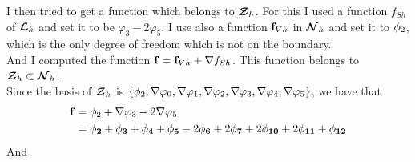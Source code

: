 I then tried to get a function which belongs to ${\bm{\mathcal{Z}}}_h$. For this I used a function $f_{Sh}$ of ${\bm{\mathcal{L}}}_h$ and set it to be $\varphi_3 - 2\varphi_5$.
I use also a function ${\mathbf{f}}_{Vh}$ in ${\bm{\mathcal{N}}}_h$ and set it to ${\mathbf{\phi}}_2$, which is the only degree of freedom which is not on the boundary.\\
And I computed the function ${\mathbf{f}}={\mathbf{f}}_{Vh}+{\nabla} f_{Sh}$. This function belongs to ${\bm{\mathcal{Z}}}_h\subset{\bm{\mathcal{N}}}_h$.\\

Since the basis of ${\bm{\mathcal{Z}}}_h$ is $\{{\mathbf{\phi}}_2,{\nabla}\varphi_0,{\nabla}\varphi_1,{\nabla}\varphi_2,{\nabla}\varphi_3,{\nabla}\varphi_4,{\nabla}\varphi_5\}$, we have that 
\begin{align*}
{\mathbf{f}} &= {\mathbf{\phi}}_2 + {\nabla}\varphi_3-2{\nabla}\varphi_5\\
&= {\mathbf{\phi_2}} + {\mathbf{\phi_3}} + {\mathbf{\phi_4}} + {\mathbf{\phi_5}} -2 {\mathbf{\phi_6}} +2 {\mathbf{\phi_7}} +2 {\mathbf{\phi_{10}}} +2 {\mathbf{\phi_{11}}} + {\mathbf{\phi_{12}}}
\end{align*}
And
